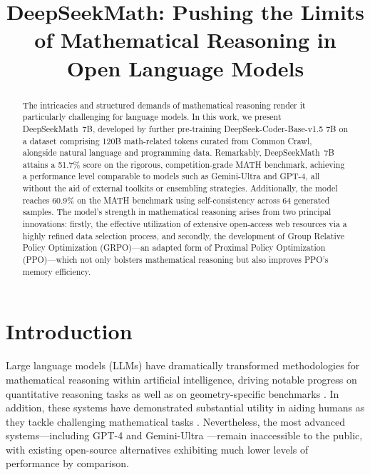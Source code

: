 \title{DeepSeekMath: Pushing the Limits of Mathematical Reasoning in Open Language Models}

\begin{abstract}
The intricacies and structured demands of mathematical reasoning render it particularly challenging for language models. In this work, we present DeepSeekMath~7B, developed by further pre-training DeepSeek-Coder-Base-v1.5 7B on a dataset comprising 120B math-related tokens curated from Common Crawl, alongside natural language and programming data. Remarkably, DeepSeekMath~7B attains a 51.7\% score on the rigorous, competition-grade MATH benchmark, achieving a performance level comparable to models such as Gemini-Ultra and GPT-4, all without the aid of external toolkits or ensembling strategies. Additionally, the model reaches 60.9\% on the MATH benchmark using self-consistency across 64 generated samples. The model’s strength in mathematical reasoning arises from two principal innovations: firstly, the effective utilization of extensive open-access web resources via a highly refined data selection process, and secondly, the development of Group Relative Policy Optimization (GRPO)—an adapted form of Proximal Policy Optimization (PPO)—which not only bolsters mathematical reasoning but also improves PPO’s memory efficiency.
\end{abstract}

\section{Introduction}

Large language models (LLMs) have dramatically transformed methodologies for mathematical reasoning within artificial intelligence, driving notable progress on quantitative reasoning tasks \citep{MATH} as well as on geometry-specific benchmarks \citep{trinh2024solving}. In addition, these systems have demonstrated substantial utility in aiding humans as they tackle challenging mathematical tasks \citep{tao}. Nevertheless, the most advanced systems—including GPT-4 \citep{gpt4} and Gemini-Ultra \citep{gemini}—remain inaccessible to the public, with existing open-source alternatives exhibiting much lower levels of performance by comparison.

